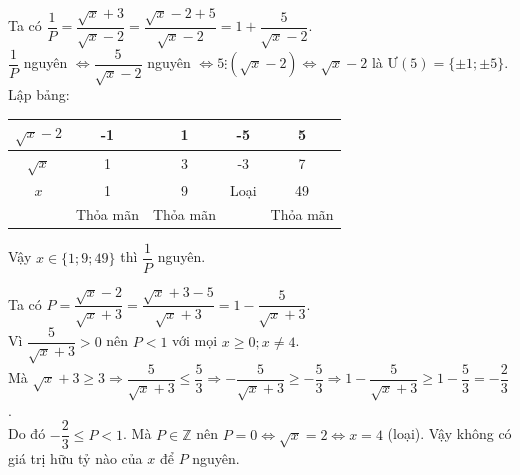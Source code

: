 \begin{bt}
{\begin{cacy}
\item Ta có $\dfrac{1}{P} = \dfrac{\sqrt{x}+3}{\sqrt{x}-2} = \dfrac{\sqrt{x}-2+5}{\sqrt{x}-2} = 1 + \dfrac{5}{\sqrt{x}-2}$.\\
$\dfrac{1}{P}$ nguyên $\Leftrightarrow \dfrac{5}{\sqrt{x}-2}$ nguyên $\Leftrightarrow 5 \vdots \left(\sqrt{x}-2\right) \Leftrightarrow \sqrt{x}-2$ là $\text{Ư}(5) = \{\pm 1; \pm 5\}$.\\
Lập bảng:
\begin{center}
\begin{tabular}{|c|c|c|c|c|}
\hline
$\sqrt{x}-2$ & -1 & 1 & -5 & 5 \\ \hline
$\sqrt{x}$ & 1 & 3 & -3 & 7 \\ \hline
$x$ & 1 & 9 & Loại & 49 \\ \hline
& Thỏa mãn & Thỏa mãn & & Thỏa mãn \\ \hline
\end{tabular}
\end{center}
Vậy $x \in \{1; 9; 49\}$ thì $\dfrac{1}{P}$ nguyên.

\item Ta có $P = \dfrac{\sqrt{x}-2}{\sqrt{x}+3} = \dfrac{\sqrt{x}+3-5}{\sqrt{x}+3} = 1 - \dfrac{5}{\sqrt{x}+3}$.\\
Vì $\dfrac{5}{\sqrt{x}+3} > 0$ nên $P < 1$ với mọi $x \ge 0; x \ne 4$.\\
Mà $\sqrt{x}+3 \ge 3 \Rightarrow \dfrac{5}{\sqrt{x}+3} \le \dfrac{5}{3} \Rightarrow -\dfrac{5}{\sqrt{x}+3} \ge -\dfrac{5}{3} \Rightarrow 1 - \dfrac{5}{\sqrt{x}+3} \ge 1 - \dfrac{5}{3} = -\dfrac{2}{3}$.\\
Do đó $-\dfrac{2}{3} \le P < 1$. Mà $P \in \mathbb{Z}$ nên $P = 0 \Leftrightarrow \sqrt{x} = 2 \Leftrightarrow x = 4$ (loại). Vậy không có giá trị hữu tỷ nào của $x$ để $P$ nguyên.
\end{cacy}
}
\end{bt}

